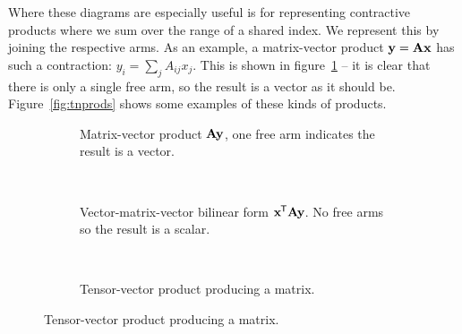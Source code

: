 Where these diagrams are especially useful is for representing contractive products
where we sum over the range of a shared index. We represent this by joining the
respective arms. As an example, a matrix-vector product \(\mathbf{y} = \mathbf{Ax}\)
has such a contraction: \(y_{i} = \sum_{j}A_{ij}x_{j}\). This is shown in
figure~\ref{fig:tnmatvec} -- it is clear that there is only a single free arm, so the
result is a vector as it should be. Figure~\ref{fig:tnprods} shows some examples
of these kinds of products.

\begin{figure}
	\centering
	\begin{subfigure}[t]{0.45\textwidth}
		\centering
		\caption{Matrix-vector product \(\mathbf{A}\mathbf{y}\), one free arm indicates
		 the result is a vector.}
		 \label{fig:tnmatvec}
	\end{subfigure} ~
	\begin{subfigure}[t]{0.45\textwidth}
		\centering
		\caption{Vector-matrix-vector bilinear form \(\mathbf{x}^{\mkern-1.5mu\mathsf{T}}\mathbf{A}
				 \mathbf{y}\). No free arms so the result is a scalar.}
	\end{subfigure}\\
	\begin{subfigure}[t]{0.45\textwidth}
		\centering
		\caption{Tensor-vector product producing a matrix.}

\end{subfigure}
\end{figure}
